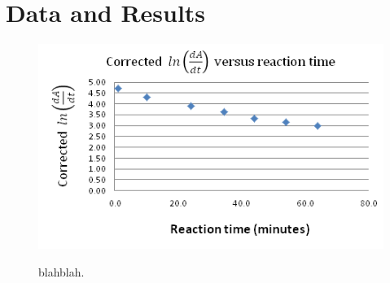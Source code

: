 \section{Data and Results}
\begin{figure}[h]
  \includegraphics{./Figures/016M_dipic_readings.png}\\
  \caption{blahblah.}\label{fig:016M_dipic_readings}
\end{figure}


